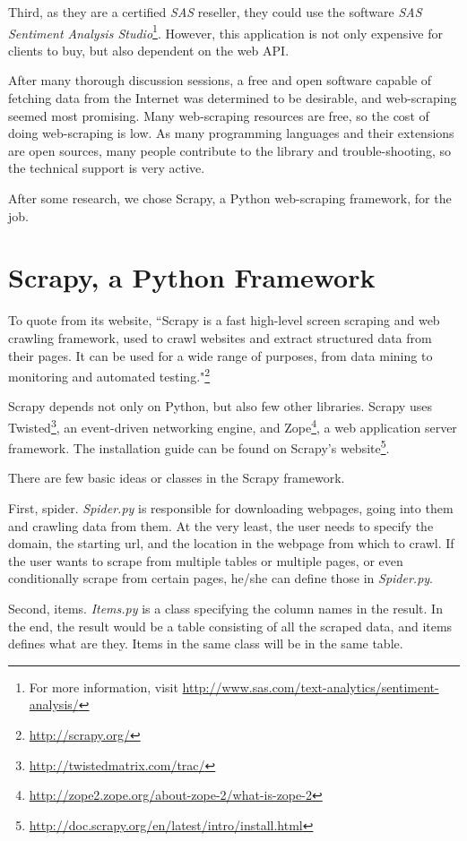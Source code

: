 \documentclass[12pt]{report}
\begin{document}
Third, as they are a certified \textit{SAS} reseller, they could use the software \textit{SAS Sentiment Analysis Studio}\footnote{For more information, visit \url{http://www.sas.com/text-analytics/sentiment-analysis/}}. However, this application is not only expensive for clients to buy, but also dependent on the web API. 

After many thorough discussion sessions, a free and open software capable of fetching data from the Internet was determined to be desirable, and web-scraping seemed most promising. Many web-scraping resources are free, so the cost of doing web-scraping is low. As many programming languages and their extensions are open sources, many people contribute to the library and trouble-shooting, so the technical support is very active.

After some research, we chose Scrapy, a Python web-scraping framework, for the job.

\section{Scrapy, a Python Framework}

To quote from its website, ``Scrapy is a fast high-level screen scraping and web crawling framework, used to crawl websites and extract structured data from their pages. It can be used for a wide range of purposes, from data mining to monitoring and automated testing."\footnote{\url{http://scrapy.org/}}

Scrapy depends not only on Python, but also few other libraries. Scrapy uses Twisted\footnote{\url{http://twistedmatrix.com/trac/}}, an event-driven networking engine, and Zope\footnote{\url{http://zope2.zope.org/about-zope-2/what-is-zope-2}}, a web application server framework. The installation guide can be found on Scrapy's website\footnote{\url{http://doc.scrapy.org/en/latest/intro/install.html}}.

There are few basic ideas or classes in the Scrapy framework.

First, spider. \textit{Spider.py} is responsible for downloading webpages, going into them and crawling data from them. At the very least, the user needs to specify the domain, the starting url, and the location in the webpage from which to crawl. If the user wants to scrape from multiple tables or multiple pages, or even conditionally scrape from certain pages, he/she can define those in \textit{Spider.py}.

Second, items. \textit{Items.py} is a class specifying the column names in the result. In the end, the result would be a table consisting of all the scraped data, and items defines what are they. Items in the same class will be in the same table.
\end{document}
